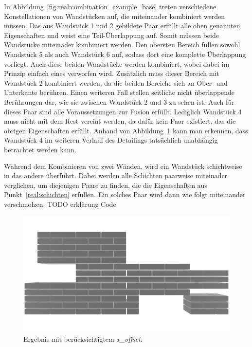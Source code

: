 In Abbildung~\ref{fig:real:combination_example_base} treten verschiedene Konstellationen von Wandstücken auf, die miteinander kombiniert werden müssen.
Das aus Wandstück 1 und 2 gebildete Paar erfüllt alle oben genannten Eigenschaften und weist eine Teil-Überlappung auf.
Somit müssen beide Wandstücke miteinader kombiniert werden.
Den obersten Bereich füllen sowohl Wandstück 5 als auch Wandstück 6 auf, sodass dort eine komplette Überlappung vorliegt.
Auch diese beiden Wandstücke werden kombiniert, wobei dabei im Prinzip einfach eines verworfen wird.
Zusätzlich muss dieser Bereich mit Wandstück 2 kombiniert werden, da die beiden Bereiche sich an Ober- und Unterkante berühren.
Einen weiteren Fall stellen seitliche nicht überlappende Berührungen dar, wie sie zwischen Wandstück 2 und 3 zu sehen ist.
Auch für dieses Paar sind alle Voraussetzungen zur Fusion erfüllt.
Lediglich Wandstück 4 muss nicht mit dem Rest vereint werden, da dafür kein Paar existiert, das die obrigen Eigenschaften erfüllt.
Anhand von Abbildung~\ref{fig:real:combination_example_solution_xoffset} kann man erkennen, dass Wandstück 4 im weiteren Verlauf des Detailings tatsächlich unabhängig betrachtet werden kann. 

Während dem Kombinieren von zwei Wänden, wird ein Wandstück schichtweise in das andere überführt.
Dabei werden alle Schichten paarweise miteinader verglichen, um diejenigen Paare zu finden, die die Eigenschaften aus Punkt~\ref{real:schichten} erfüllen.
Ein solches Paar wird dann wie folgt miteinander verschmolzen:
TODO erklärung Code

\begin{figure}[ht!]
  \centering
  \includegraphics[width=0.8\columnwidth]{fig/Real_Combination_Output.png}
  \caption{Ergebnis mit berücksichtigtem \textit{x\_offset}.}
  \label{fig:real:combination_example_solution_xoffset}
\end{figure}


